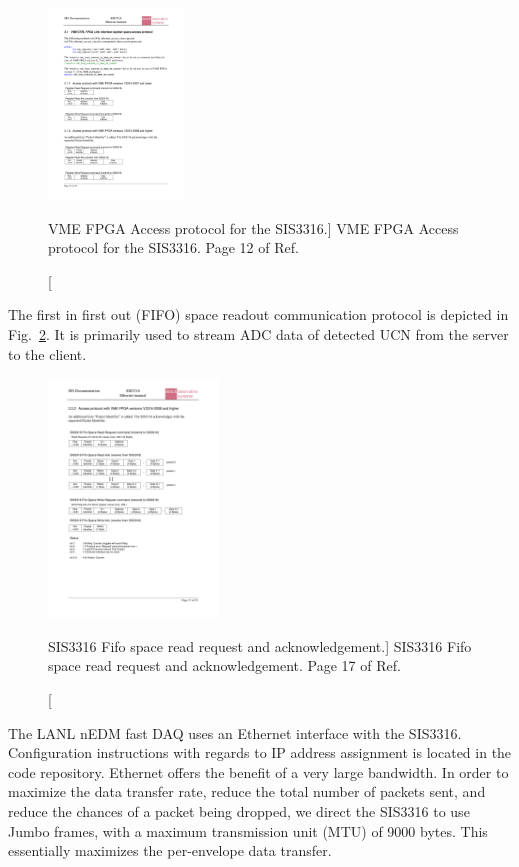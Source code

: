 \begin{figure}
    \centering
    \includegraphics[height=2in]{figures/sis3316_ethernet_ack.pdf}
    \caption
    [VME FPGA Access protocol for the SIS3316.]
     {VME FPGA Access protocol for the SIS3316. Page 12 of Ref.~\cite{sis3316_udp_addendum}}
    \label{fig:sis3316_read_write_ack}
\end{figure}

The first in first out (FIFO) space readout communication protocol is depicted in Fig.~\ref{fig:sis3316_fifo}. It is primarily used to stream ADC data of detected UCN from the server to the client.

\begin{figure}
    \centering
    \includegraphics[height=2.5in]{figures/sis3316_fifo.pdf}
    \caption
    [SIS3316 Fifo space read request and acknowledgement.]
     {SIS3316 Fifo space read request and acknowledgement. Page 17 of Ref.~\cite{sis3316_udp_addendum}}
    \label{fig:sis3316_fifo}
\end{figure}


The LANL nEDM fast DAQ uses an Ethernet interface with the SIS3316. Configuration instructions with regards to IP address assignment is located in the code repository. Ethernet offers the benefit of a very large bandwidth. In order to maximize the data transfer rate, reduce the total number of packets sent, and reduce the chances of a packet being dropped, we direct the SIS3316 to use Jumbo frames, with a maximum transmission unit (MTU) of 9000 bytes. This essentially maximizes the per-envelope data transfer.


